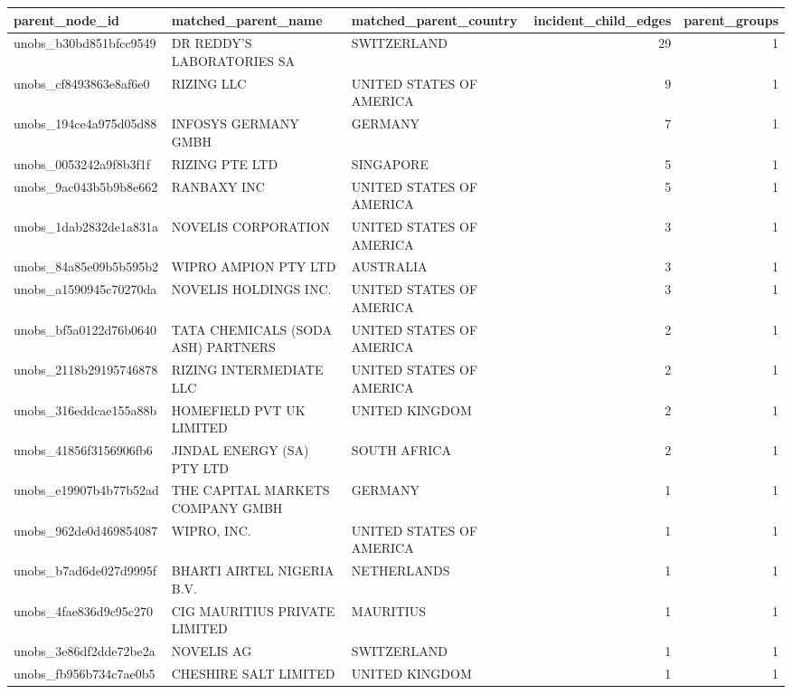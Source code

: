 \begin{tabular}{lllrr}
\toprule
parent\_node\_id & matched\_parent\_name & matched\_parent\_country & incident\_child\_edges & parent\_groups \\
\midrule
unobs\_b30bd851bfcc9549 & DR REDDY'S LABORATORIES SA & SWITZERLAND & 29 & 1 \\
unobs\_cf8493863e8af6e0 & RIZING LLC & UNITED STATES OF AMERICA & 9 & 1 \\
unobs\_194ce4a975d05d88 & INFOSYS GERMANY GMBH & GERMANY & 7 & 1 \\
unobs\_0053242a9f8b3f1f & RIZING PTE LTD & SINGAPORE & 5 & 1 \\
unobs\_9ac043b5b9b8e662 & RANBAXY INC & UNITED STATES OF AMERICA & 5 & 1 \\
unobs\_1dab2832de1a831a & NOVELIS CORPORATION & UNITED STATES OF AMERICA & 3 & 1 \\
unobs\_84a85e09b5b595b2 & WIPRO AMPION PTY LTD & AUSTRALIA & 3 & 1 \\
unobs\_a1590945c70270da & NOVELIS HOLDINGS INC. & UNITED STATES OF AMERICA & 3 & 1 \\
unobs\_bf5a0122d76b0640 & TATA CHEMICALS (SODA ASH) PARTNERS & UNITED STATES OF AMERICA & 2 & 1 \\
unobs\_2118b29195746878 & RIZING INTERMEDIATE LLC & UNITED STATES OF AMERICA & 2 & 1 \\
unobs\_316eddcae155a88b & HOMEFIELD PVT UK LIMITED & UNITED KINGDOM & 2 & 1 \\
unobs\_41856f3156906fb6 & JINDAL ENERGY (SA) PTY LTD & SOUTH AFRICA & 2 & 1 \\
unobs\_e19907b4b77b52ad & THE CAPITAL MARKETS COMPANY GMBH & GERMANY & 1 & 1 \\
unobs\_962de0d469854087 & WIPRO, INC. & UNITED STATES OF AMERICA & 1 & 1 \\
unobs\_b7ad6de027d9995f & BHARTI AIRTEL NIGERIA B.V. & NETHERLANDS & 1 & 1 \\
unobs\_4fae836d9c95c270 & CIG MAURITIUS PRIVATE LIMITED & MAURITIUS & 1 & 1 \\
unobs\_3e86df2dde72be2a & NOVELIS AG & SWITZERLAND & 1 & 1 \\
unobs\_fb956b734c7ae0b5 & CHESHIRE SALT LIMITED & UNITED KINGDOM & 1 & 1 \\
\bottomrule
\end{tabular}
